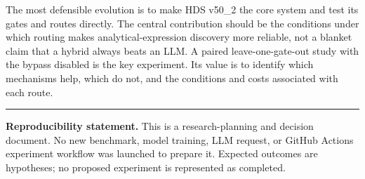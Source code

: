 \documentclass[11pt,a4paper]{article}
\begin{document}
The most defensible evolution is to make HDS v50\_2 the core system and test its gates and routes directly. The central contribution should be the conditions under which routing makes analytical-expression discovery more reliable, not a blanket claim that a hybrid always beats an LLM. A paired leave-one-gate-out study with the bypass disabled is the key experiment. Its value is to identify which mechanisms help, which do not, and the conditions and costs associated with each route.

\vspace{1em}\hrule\vspace{.5em}\small\textbf{Reproducibility statement.} This is a research-planning and decision document. No new benchmark, model training, LLM request, or GitHub Actions experiment workflow was launched to prepare it. Expected outcomes are hypotheses; no proposed experiment is represented as completed.
\end{document}
